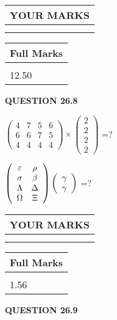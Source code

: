 \documentclass[12pt]{article}
\begin{document}
\vspace{0.2in}
  
\noindent\begin{tabular}{|l|}
\hline
 YOUR MARKS  \\
\hline
 \\ 
 \\ 
\hline
\end{tabular}
\hspace{0.05in} \begin{tabular}{|l|}
\hline
 Full Marks  \\
\hline
 \\ 
12.50 \\
\hline
\end{tabular}
{\textbf{\Large{QUESTION
26.8 
}}}
  
  
 
$ \left( \begin{array}{ccccccccc}
           4 & 
           7 & 
           5 & 
           6 \\ 
           6 & 
           6 & 
           7 & 
           5 \\ 
           4 & 
           4 & 
           4 & 
           4
\end{array}\right) \times
\left( \begin{array}{c}
           2 \\ 
           2 \\ 
           2 \\ 
           2
\end{array}\right) $ =?
 
 
$  %
 \left( \begin{array}
 {
 c
 c
 }
 \varepsilon & 
 \rho \\ 
 \sigma & 
 \beta \\ 
 \Lambda & 
 \Delta \\ 
 \Omega & 
                    \Xi
 \end{array} \right)
 \left( \begin{array}
 {
 c
 }
 \gamma \\ 
 \gamma
 \end{array} \right)
$ =?
 

 

 
\vspace{0.3in}
  
\vspace{0.2in}
  
\noindent\begin{tabular}{|l|}
\hline
 YOUR MARKS  \\
\hline
 \\ 
 \\ 
\hline
\end{tabular}
\hspace{0.05in} \begin{tabular}{|l|}
\hline
 Full Marks  \\
\hline
 \\ 
1.56 \\
\hline
\end{tabular}
{\textbf{\Large{QUESTION
26.9 
}}}
  
\end{document}
